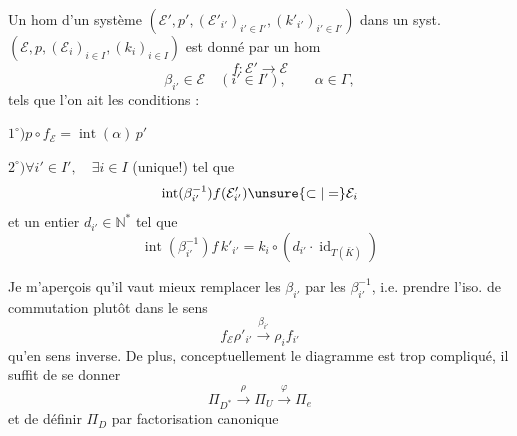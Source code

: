 
Un hom d'un système
$(\mathcal E',p',(\mathcal E'_{i'})_{i'\in I'},(k'_{i'})_{i'\in I'})$
dans un syst.
$(\mathcal E,p,(\mathcal E_i)_{i\in I},(k_i)_{i\in I})$
est donné par  un hom
\[
f:\mathcal E'\longrightarrow\mathcal E
\]
\[
\beta_{i'}\in\mathcal E\quad(i'\in I'),\qquad\alpha\in\Gamma,
\]
tels que l'on ait les conditions :



$1^\circ)$\quad $p\circ f_{\mathcal E}=\operatorname{int}(\alpha)\,p'$

$2^\circ)$\quad $\forall i'\in I',\quad\exists i\in I$ (unique!) tel que
\[
\operatorname{int}(\beta_{i'}^{-1})f(\mathcal E'_{i'})\unsure{\subset|=}\mathcal E_i
\]
et un entier $d_{i'}\in\mathbb N^*$ tel que
\[
\operatorname{int}(\beta_{i'}^{-1})f\,k'_{i'}
 =k_i\circ(d_{i'}\cdot\operatorname{id}_{T(\bar K)})
\]


\margin{[donc $\operatorname{int}(\beta_{i'}^{-1})\overbrace{\unsure{\operatorname{Im}(fk'_{i'})}}^{L'_{i'}}\subset\underbrace{\operatorname{Im}k_i}_{L_i}$ et \unsure{même} \deleted{\illegible{2}} $\operatorname{int}(\beta_{i'}^{-1})\unsure{L'_{i'}}=d_{i'}L_i$.]}


Je m'aperçois qu'il vaut mieux remplacer les $\beta_{i'}$ par les $\beta_{i'}^{-1}$, i.e. prendre l'iso. de commutation plutôt dans le sens
\[
f_{\mathcal E}\rho'_{i'}\xrightarrow{\beta_{i'}}\rho_i f_{i'}
\]
qu'en sens inverse. De plus, conceptuellement le diagramme
est trop compliqué, il suffit de se donner
\[
\boxed{\Pi_{D^*}\xrightarrow{\rho}\Pi_U\xrightarrow{\varphi}\Pi_e}
\]
et de définir $\Pi_D$ par factorisation canonique

